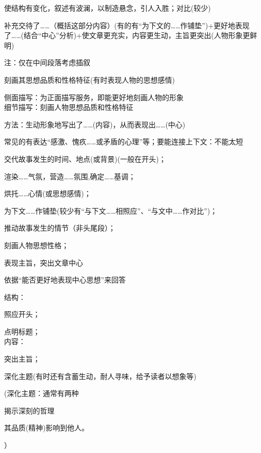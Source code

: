 使结构有变化，叙述有波澜，以制造悬念，引人入胜；对比(较少)

补充交待了\ldots{}\ldots{}（概括这部分内容）(有的有``为下文的\ldots{}\ldots{}作铺垫'')+更好地表现了\ldots{}\ldots{}(结合``中心''分析)+使文章更充实，内容更生动，主旨更突出(人物形象更鲜明)\par
注：仅在中间段落考虑插叙

刻画其思想品质和性格特征(有时表现人物的思想感情)\par
侧面描写：为正面描写服务，即能更好地刻画人物的形象\\
细节描写：刻画人物思想品质和性格特征\par
方法：生动形象地写出了\ldots{}\ldots{}(内容)，从而表现出\ldots{}\ldots{}(中心)

常见的有表达``感激、愧疚\ldots{}\ldots{}或矛盾的心理''等；要能连接上下文：不能太短

\begin{asparaenum}[(1)]
\item 交代故事发生的时间、地点(或背景)(一般在开头)；
\item 渲染\ldots{}\ldots{}气氛，营造\ldots{}\ldots{}氛围,确定\ldots{}\ldots{}基调；
\item 烘托\ldots{}\ldots{}心情(或思想感情)；
\item 为下文\ldots{}\ldots{}作铺垫(较少有``与下文\ldots{}\ldots{}相照应''、``与文中\ldots{}\ldots{}作对比'')；
\item 推动故事发生的情节（非头尾段）；
\item 刻画人物思想性格；
\item 表现主旨，突出文章中心
\end{asparaenum}

依据``能否更好地表现中心思想''来回答

结构：\begin{asparaenum}[(1)]\item 照应开头；
        \item 点明标题；\\
内容：\item 突出主旨；
        \item 深化主题(有时还有含蓄生动，耐人寻味，给予读者以想象等)\end{asparaenum}
        (深化主题：通常有两种\begin{inparaenum}[(1)]\item 揭示深刻的哲理\item 其品质(精神)影响到他人。\end{inparaenum}）

